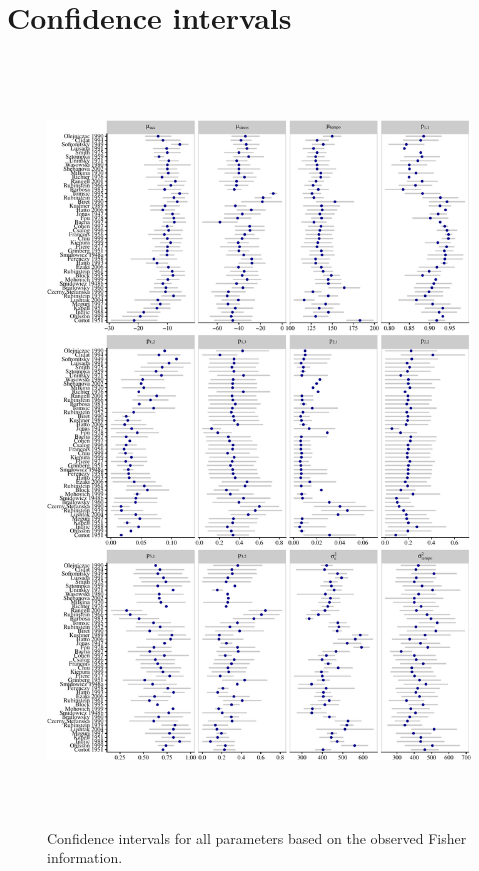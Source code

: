 \documentclass[aoas]{imsart}
\begin{document}
\hypertarget{confidence-intervals}{%
\section{Confidence intervals}\label{confidence-intervals}}

\begin{figure}

{\centering \includegraphics[width=5.333in,height=8in]{gfx/confidence-intervals-1} 

}

\caption{Confidence intervals for all parameters based on the observed Fisher information.}\label{fig:confidence-intervals}
\end{figure}
\end{document}
